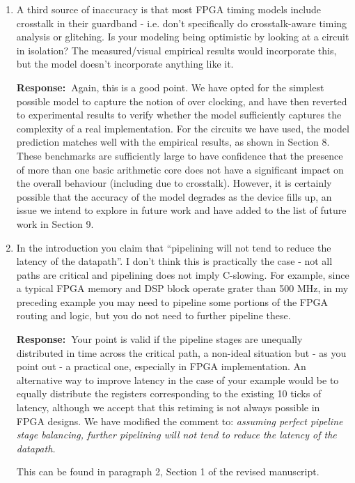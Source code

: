 \documentclass[a4paper, 11pt]{article}
\def\Response{\noindent \textbf{Response:~}}
\newcommand{\Question}[1]{\textcolor[rgb]{0.51,0.00,0.00}{#1}}
\newcommand{\PaperText}[1]{\emph{#1}}
\begin{document}
\begin{enumerate}
  \item \Question{A third source of inaccuracy is that most FPGA timing models include crosstalk in their guardband - i.e. don't specifically do crosstalk-aware timing analysis or glitching.  Is your modeling being optimistic by looking at a circuit in isolation?  The measured/visual empirical results would incorporate this, but the model doesn't incorporate anything like it.}
      
      \Response Again, this is a good point. We have opted for the simplest possible model to capture the notion of over clocking, and have then reverted to experimental results to verify whether the model sufficiently captures the complexity of a real implementation. For the circuits we have used, the model prediction matches well with the empirical results, as shown in Section 8. These benchmarks are sufficiently large to have confidence that the presence of more than one basic arithmetic core does not have a significant impact on the overall behaviour (including due to crosstalk). However, it is certainly possible that the accuracy of the model degrades as the device fills up, an issue we intend to explore in future work and have added to the list of future work in Section 9.\\

  \item \Question{In the introduction you claim that ``pipelining will not tend to reduce the latency of the datapath''. I don't think this is practically the case - not all paths are critical and pipelining does not imply C-slowing. For example, since a typical FPGA memory and DSP block operate grater than 500 MHz, in my preceding example you may need to pipeline some portions of the FPGA routing and logic, but you do not need to further pipeline these.}
      
      \Response Your point is valid if the pipeline stages are unequally distributed in time across the critical path, a non-ideal situation but - as you point out - a practical one, especially in FPGA implementation. An alternative way to improve latency in the case of your example would be to equally distribute the registers corresponding to the existing 10 ticks of latency, although we accept that this retiming is not always possible in FPGA designs. We have modified the comment to:
      \PaperText{assuming perfect pipeline stage balancing, further pipelining will not tend to reduce the latency of the datapath.}

      This can be found in paragraph 2, Section 1 of the revised manuscript.\\
  

\end{enumerate}
\end{document}
